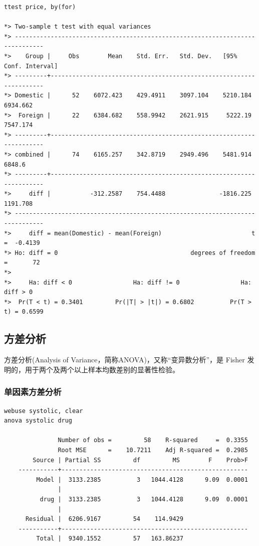 \documentclass[]{ctexbook}
\begin{document}
\begin{lstlisting}
ttest price, by(for)

*> Two-sample t test with equal variances
*> ------------------------------------------------------------------------------
*>    Group |     Obs        Mean    Std. Err.   Std. Dev.   [95% Conf. Interval]
*> ---------+--------------------------------------------------------------------
*> Domestic |      52    6072.423    429.4911    3097.104    5210.184    6934.662
*>  Foreign |      22    6384.682    558.9942    2621.915     5222.19    7547.174
*> ---------+--------------------------------------------------------------------
*> combined |      74    6165.257    342.8719    2949.496    5481.914      6848.6
*> ---------+--------------------------------------------------------------------
*>     diff |           -312.2587    754.4488               -1816.225    1191.708
*> ------------------------------------------------------------------------------
*>     diff = mean(Domestic) - mean(Foreign)                         t =  -0.4139
*> Ho: diff = 0                                     degrees of freedom =       72
*> 
*>     Ha: diff < 0                 Ha: diff != 0                 Ha: diff > 0
*>  Pr(T < t) = 0.3401         Pr(|T| > |t|) = 0.6802          Pr(T > t) = 0.6599
\end{lstlisting}

\hypertarget{section-20}{%
\subsection{方差分析}\label{section-20}}

方差分析(Analysis of Variance，简称ANOVA)，又称``变异数分析''，是 Fisher 发明的，用于两个及两个以上样本均数差别的显著性检验。

\hypertarget{section-21}{%
\subsubsection{单因素方差分析}\label{section-21}}

\begin{lstlisting}
webuse systolic, clear
anova systolic drug

               Number of obs =         58    R-squared     =  0.3355
               Root MSE      =    10.7211    Adj R-squared =  0.2985       
        Source | Partial SS         df         MS        F    Prob>F
    -----------+----------------------------------------------------
         Model |  3133.2385          3   1044.4128      9.09  0.0001
               |
          drug |  3133.2385          3   1044.4128      9.09  0.0001
               |
      Residual |  6206.9167         54    114.9429  
    -----------+----------------------------------------------------
         Total |  9340.1552         57   163.86237  
\end{lstlisting}
\end{document}
